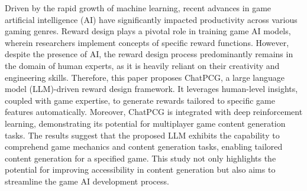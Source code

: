 Driven by the rapid growth of machine learning, recent advances in game artificial intelligence (AI) have significantly impacted productivity across various gaming genres. 
Reward design plays a pivotal role in training game AI models, wherein researchers implement concepts of specific reward functions.
However, despite the presence of AI, the reward design process predominantly remains in the domain of human experts, as it is heavily reliant on their creativity and engineering skills.
Therefore, this paper proposes ChatPCG, a large language model (LLM)-driven reward design framework.
It leverages human-level insights, coupled with game expertise, to generate rewards tailored to specific game features automatically.
Moreover, ChatPCG is integrated with deep reinforcement learning, demonstrating its potential for multiplayer game content generation tasks.
The results suggest that the proposed LLM exhibits the capability to comprehend game mechanics and content generation tasks, enabling tailored content generation for a specified game.
This study not only highlights the potential for improving accessibility in content generation but also aims to streamline the game AI development process.